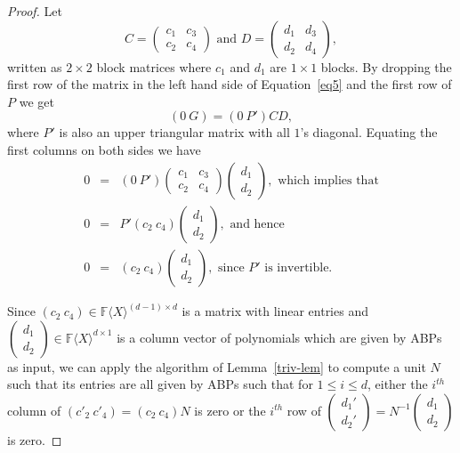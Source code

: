 \documentclass[10pt,a4paper]{article}
\newcommand{\F}{\mathbb{F}}
\renewcommand{\angle}[1]{\langle #1 \rangle}
\newcommand{\FX}{\F\angle{X}}
\newcommand{\fR}{\FX}
\begin{document}
\begin{proof}
Let
\[C=\left(
\begin{array}{cc}
c_1 & c_3 \\
c_2 & c_4
\end{array}
\right) \text{ and }
D = 
  \left(
\begin{array}{cc}
d_1 & d_3\\
d_2 & d_4
\end{array}
\right),
\]
written as $2\times 2$ block matrices where $c_1$ and $d_1$ are
$1\times 1$ blocks. By dropping the first row of the matrix in the
left hand side of Equation~\ref{eq5} and the first row of $P$ we
get
\[
  (0~G) = (0~P') C D,
\]
where $P'$ is also an upper triangular matrix with all $1$'s diagonal.
Equating the first columns on both sides we have
\begin{eqnarray*}
  0 & =&  (0~P')\left(
\begin{array}{cc}
c_1 & c_3 \\
c_2 & c_4
\end{array}
\right)\left(\begin{array}{c} d_1\\ d_2 \end{array} \right),
  \text{ which implies that}\\
  0 & = & P'(c_2~c_4)\left(\begin{array}{c} d_1\\ d_2 \end{array} \right),
  \text{ and hence}\\
  0 & = & (c_2~c_4)\left(\begin{array}{c} d_1\\ d_2 \end{array} \right),
  \text{ since $P'$ is invertible.}
\end{eqnarray*}

%

Since $(c_2~c_4)\in\fR^{(d-1)\times d}$ is a matrix with linear
entries and $\left(\begin{array}{c} d_1\\ d_2 \end{array} \right)\in\fR^{d\times 1}$ is a column vector of
polynomials which are given by ABPs as input, we can apply the
algorithm of Lemma~\ref{triv-lem} to compute a unit
$N$ such that its entries are all given by
ABPs such that for $1\le i\le d$, either the $i^{th}$ column of
$(c'_2~c'_4)=(c_2~c_4)N$ is zero or the $i^{th}$ row of
$\left(\begin{array}{c} d_1'\\ d_2' \end{array}
 \right)=N^{-1}\left(\begin{array}{c} d_1\\ d_2 \end{array}
 \right)$ is zero.


\end{proof}
\end{document}

